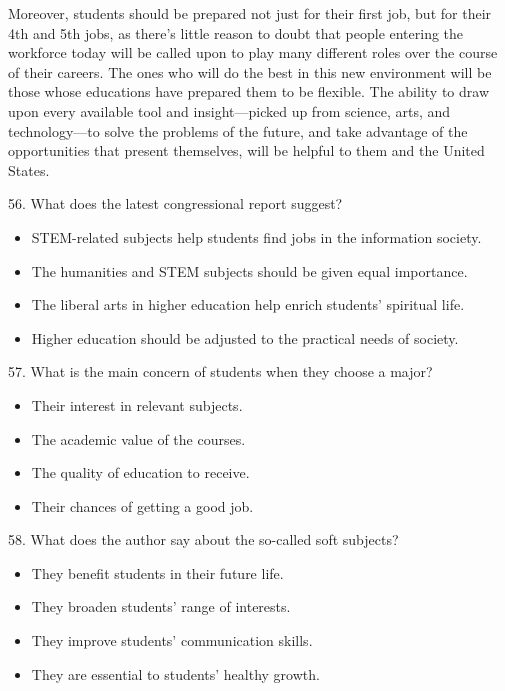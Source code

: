 \documentclass[UTF8,11pt]{ctexart}
\begin{document}
Moreover, students should be prepared not just for their first job, but for their 4th and 5th jobs, as there’s little reason to doubt that people entering the workforce today will be called upon to play many different roles over the course of their careers. The ones who will do the best in this new environment will be those whose educations have prepared them to be flexible. The ability to draw upon every available tool and insight—picked up from science, arts, and technology—to solve the problems of the future, and take advantage of the opportunities that present themselves, will be helpful to them and the United States.


56. What does the latest congressional report suggest?


\begin{itemize}[leftmargin=2em,itemsep=.2em,topsep=.4em]\item[A.] STEM-related subjects help students find jobs in the information society.
\item[B.] The humanities and STEM subjects should be given equal importance.
\item[C.] The liberal arts in higher education help enrich students’ spiritual life.
\item[D.] Higher education should be adjusted to the practical needs of society.
\end{itemize}

57. What is the main concern of students when they choose a major?


\begin{itemize}[leftmargin=2em,itemsep=.2em,topsep=.4em]\item[A.] Their interest in relevant subjects.
\item[B.] The academic value of the courses.
\item[C.] The quality of education to receive.
\item[D.] Their chances of getting a good job.
\end{itemize}

58. What does the author say about the so-called soft subjects?


\begin{itemize}[leftmargin=2em,itemsep=.2em,topsep=.4em]\item[A.] They benefit students in their future life.
\item[B.] They broaden students’ range of interests.
\item[C.] They improve students’ communication skills.
\item[D.] They are essential to students’ healthy growth.
\end{itemize}
\end{document}

